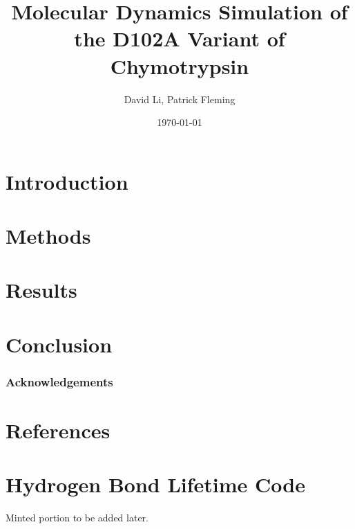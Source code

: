 \documentclass[11pt, twocolumn]{article}
\begin{document}
\title{Molecular Dynamics Simulation of the D102A Variant of Chymotrypsin}
\author{David Li, Patrick Fleming}
\date{\today}
\maketitle

\section{Introduction}

\lipsum[1-3]

\section{Methods}
\lipsum[4-5]

\section{Results}

\section{Conclusion}

\subsubsection*{Acknowledgements}

\section{References}


\appendix

\section{Hydrogen Bond Lifetime Code}

Minted portion to be added later.
\end{document}
